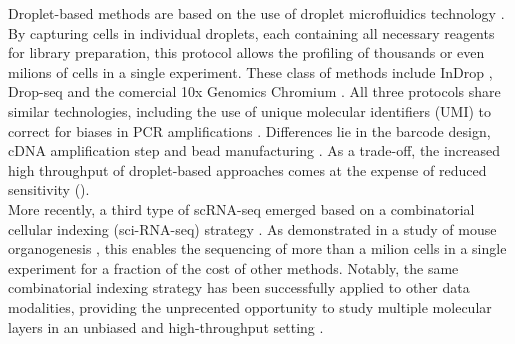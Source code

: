 Droplet-based methods are based on the use of droplet microfluidics technology \cite{Zhang2019}. By capturing cells in individual droplets, each containing all necessary reagents for library preparation, this protocol allows the profiling of thousands or even milions of cells in a single experiment. These class of methods include InDrop \cite{Klein2015,Zilionis2016}, Drop-seq\cite{Macosko2015} and the comercial 10x Genomics Chromium \cite{Zheng2017}. All three protocols share similar technologies, including the use of unique molecular identifiers (UMI) to correct for biases in PCR amplifications \cite{Kivioja2011}. Differences lie in the barcode design, cDNA amplification step and bead manufacturing \cite{Zhang2019}. As a trade-off, the increased high throughput of droplet-based approaches comes at the expense of reduced sensitivity\cite{Ziegenhain2017,Wang2019,Svensson2017} ().\\

More recently, a third type of scRNA-seq emerged based on a combinatorial cellular indexing (sci-RNA-seq) strategy \cite{Cao2017}. As demonstrated in a study of mouse organogenesis \cite{Cao2019}, this enables the sequencing of more than a milion cells in a single experiment for a fraction of the cost of other methods. Notably, the same combinatorial indexing strategy has been successfully applied to other data modalities, providing the unprecented opportunity to study multiple molecular layers in an unbiased and high-throughput setting \cite{Vitak2017, Ramani2017, Mulqueen2018}.

